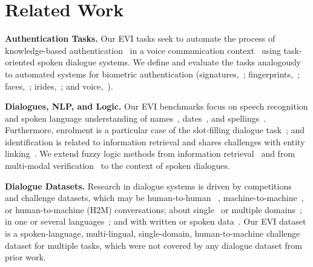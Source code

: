 \documentclass[11pt]{article}
\newcommand{\sparagraph}[1]{\noindent\textbf{#1.}}
\newcommand{\rparagraph}[1]{\vspace{1.4mm}\noindent\textbf{#1.}}
\begin{document}
{\section{Related Work}

\vspace{-1mm}

\sparagraph{Authentication Tasks}
Our EVI tasks
seek to automate the process
of knowledge-based authentication~\cite{braz2006security,o2003comparing} in a voice communication context~\cite{o2006comparing,o2006speak,o2005query}
using task-oriented spoken dialogue systems.
We define and evaluate the tasks
analogously to 
automated systems for biometric authentication
(signatures,~\citealp{yeung2004svc2004};
fingerprints,~\citealp{maio2002fvc2000};
faces,~\citealp{phillips2003face};
irides,~\citealp{phillips2008iris};
and voice,~\citealp{doddington2000nist}).
\vspace{-0.5mm}

\rparagraph{Dialogues, NLP, and Logic}
Our {EVI benchmarks}
focus on speech recognition and spoken language understanding
of names~\cite{kaplan2020may,pappu2014knowledge},
dates~\cite{price2021hybrid},
and spellings~\cite{vertanen2012spelling,filisko2004error,chung2003automatic}.
Furthermore,
enrolment is
a particular case of the slot-filling dialogue task~\cite{young2002talking,bellegarda2014spoken};
and identification
is related to
information retrieval 
and shares challenges with entity linking~\cite{ling2015design,hoffart2014discovering,mcnamee2009overview}.
We extend fuzzy logic methods
from information retrieval~\cite{radecki1979fuzzy,zadrozny2009fuzzy,salton1983extended}
and
from multi-modal verification~\cite{lau2004fuzzy,conti2007fuzzy,azzini2007fuzzy}
to the context of spoken dialogues.




\rparagraph{Dialogue Datasets}
Research in dialogue systems
is driven by competitions~\cite{kim2019eighth,gunasekara2020overview}
and challenge datasets,
which may be
human-to-human
~\cite{schrading2015analysis,lowe2015ubuntu,ritter2010unsupervised},
machine-to-machine~\cite{shah2018building},
or human-to-machine (H2M) conversations;
about
single~\cite{coope2020span,wen2016network,hemphill1990atis}
or multiple domains~\cite{rastogi2020towards,zhu2020crosswoz,zang2020multiwoz,budzianowski2018multiwoz,asri2017frames};
in one or several languages~\cite{xu2020end,li2020mtop};
and
with written or spoken data~\cite{lugosch2019speech,li2018spoken,hemphill1990atis}.
Our EVI dataset is a spoken-language, multi-lingual, single-domain, human-to-machine challenge dataset for multiple tasks, which were not covered by any dialogue dataset from prior work.






}
\end{document}
